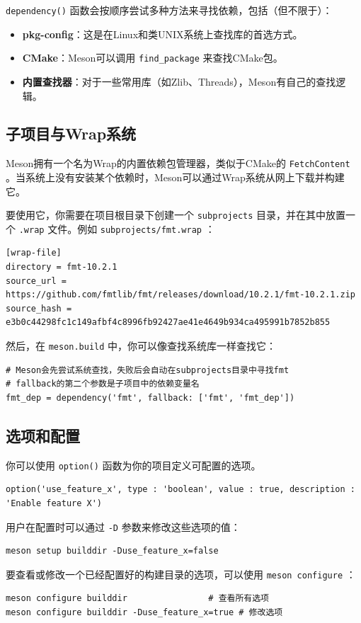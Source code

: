\texttt{dependency()}  函数会按顺序尝试多种方法来寻找依赖，包括（但不限于）：
\begin{itemize}
    \item \textbf{pkg-config}：这是在Linux和类UNIX系统上查找库的首选方式。
    \item \textbf{CMake}：Meson可以调用 \texttt{find\_package} 来查找CMake包。
    \item \textbf{内置查找器}：对于一些常用库（如Zlib、Threads），Meson有自己的查找逻辑。
\end{itemize}

\subsection{子项目与Wrap系统}
Meson拥有一个名为Wrap的内置依赖包管理器，类似于CMake的 \texttt{FetchContent} 。当系统上没有安装某个依赖时，Meson可以通过Wrap系统从网上下载并构建它。

要使用它，你需要在项目根目录下创建一个 \texttt{subprojects} 目录，并在其中放置一个 \texttt{.wrap} 文件。例如 \texttt{subprojects/fmt.wrap} ：
\begin{verbatim}
[wrap-file]
directory = fmt-10.2.1
source_url = https://github.com/fmtlib/fmt/releases/download/10.2.1/fmt-10.2.1.zip
source_hash = e3b0c44298fc1c149afbf4c8996fb92427ae41e4649b934ca495991b7852b855
\end{verbatim}
然后，在 \texttt{meson.build} 中，你可以像查找系统库一样查找它：
\begin{verbatim}
# Meson会先尝试系统查找，失败后会自动在subprojects目录中寻找fmt
# fallback的第二个参数是子项目中的依赖变量名
fmt_dep = dependency('fmt', fallback: ['fmt', 'fmt_dep'])
\end{verbatim}

\subsection{选项和配置}
你可以使用 \texttt{option()} 函数为你的项目定义可配置的选项。
\begin{verbatim}
option('use_feature_x', type : 'boolean', value : true, description : 'Enable feature X')
\end{verbatim}
用户在配置时可以通过 \texttt{-D} 参数来修改这些选项的值：
\begin{verbatim}
meson setup builddir -Duse_feature_x=false
\end{verbatim}
要查看或修改一个已经配置好的构建目录的选项，可以使用 \texttt{meson configure} ：
\begin{verbatim}
meson configure builddir                # 查看所有选项
meson configure builddir -Duse_feature_x=true # 修改选项
\end{verbatim}

